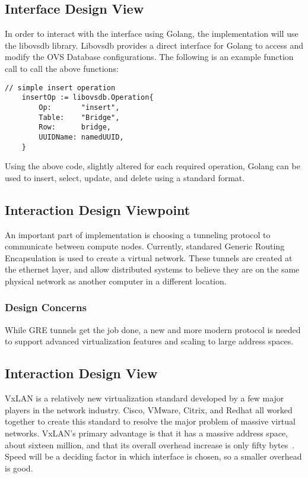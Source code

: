 \documentclass[10pt,onecolumn,journal,draftclsnofoot]{IEEEtran}
\begin{document}
\subsection{Interface Design View}
In order to interact with the interface using Golang, the implementation will
use the libovsdb library\cite{libovsdb}. Libovsdb provides a direct interface
for Golang to access and modify the OVS Database configurations. The following
is an example function call to call the above functions:\cite{gosample}\\

\begin{lstlisting}[caption=Example insert operation in the OVS Database]
	// simple insert operation
	insertOp := libovsdb.Operation{
		Op:       "insert",
		Table:    "Bridge",
		Row:      bridge,
		UUIDName: namedUUID,
	}
\end{lstlisting}

Using the above code, slightly altered for each required operation, Golang can
be used to insert, select, update, and delete using a standard format.
\subsection{Interaction Design Viewpoint}
An important part of implementation is choosing a tunneling protocol to
communicate between compute nodes. Currently, standared Generic Routing
Encapsulation is used to create a virtual network. These tunnels are created at
the ethernet layer, and allow distributed systems to believe they are on the
same physical network as another computer in a different location.

\subsubsection{Design Concerns}
While GRE tunnels get the job done, a new and more modern protocol is needed to
support advanced virtualization features and scaling to large address spaces.

\subsection{Interaction Design View}
VxLAN is a relatively new virtualization standard developed by a few major
players in the network industry. Cisco, VMware, Citrix, and Redhat all worked
together to create this standard to resolve the major problem of massive
virtual networks. VxLAN's primary advantage is that it has a massive address
space, about sixteen million, and that its overall overhead increase is only
fifty bytes~\cite{vxlan}. Speed will be a deciding factor in which interface is
chosen, so a smaller overhead is good.
\end{document}
